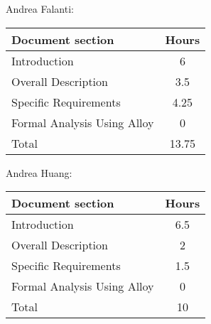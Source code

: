 Andrea Falanti:

\begin{tabular}{|l|c|}
    \hline
    Document section & Hours \\
    \hline
     Introduction & 6\\
     Overall Description & 3.5\\
     Specific Requirements & 4.25\\
     Formal Analysis Using Alloy & 0\\
     \hline
     Total & 13.75\\
     \hline
\end{tabular}
\vskip 0.3in

Andrea Huang:

\begin{tabular}{|l|c|}
    \hline
    Document section & Hours \\
    \hline
     Introduction &  6.5\\
     Overall Description & 2\\
     Specific Requirements & 1.5\\
     Formal Analysis Using Alloy & 0\\
     \hline
     Total & 10\\
     \hline
\end{tabular}